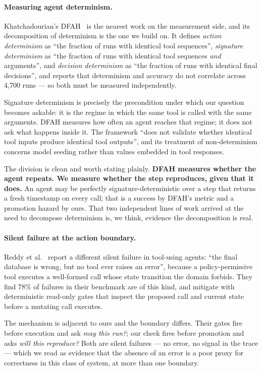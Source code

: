 \documentclass[10pt,conference]{article}
\begin{document}
\paragraph{Measuring agent determinism.} Khatchadourian's
DFAH~\cite{dfah2026} is the nearest work on the measurement side, and its
decomposition of determinism is the one we build on. It defines \emph{action
determinism} as ``the fraction of runs with identical tool sequences'',
\emph{signature determinism} as ``the fraction of runs with identical tool
sequences \emph{and} arguments'', and \emph{decision determinism} as ``the
fraction of runs with identical final decisions'', and reports that determinism
and accuracy do not correlate across 4{,}700 runs --- so both must be measured
independently.

Signature determinism is precisely the precondition under which our question
becomes askable: it is the regime in which the same tool is called with the same
arguments. DFAH measures how often an agent reaches that regime; it does not ask
what happens inside it. The framework ``does not validate whether identical tool
inputs produce identical tool outputs'', and its treatment of non-determinism
concerns model seeding rather than values embedded in tool responses.

The division is clean and worth stating plainly. \textbf{DFAH measures whether
the agent repeats. We measure whether the step reproduces, given that it does.}
An agent may be perfectly signature-deterministic over a step that returns a
fresh timestamp on every call; that is a success by DFAH's metric and a
promotion hazard by ours. That two independent lines of work arrived at the need
to decompose determinism is, we think, evidence the decomposition is real.

\paragraph{Silent failure at the action boundary.} Reddy et
al.~\cite{reasonless2026} report a different silent failure in tool-using
agents: ``the final database is wrong, but no tool ever raises an error'',
because a policy-permissive tool executes a well-formed call whose state
transition the domain forbids. They find 78\% of failures in their benchmark are
of this kind, and mitigate with deterministic read-only gates that inspect the
proposed call and current state before a mutating call executes.

The mechanism is adjacent to ours and the boundary differs. Their gates fire
before execution and ask \emph{may this run?}; our check fires before promotion
and asks \emph{will this reproduce?} Both are silent failures --- no error, no
signal in the trace --- which we read as evidence that the absence of an error is
a poor proxy for correctness in this class of system, at more than one boundary.
\end{document}
